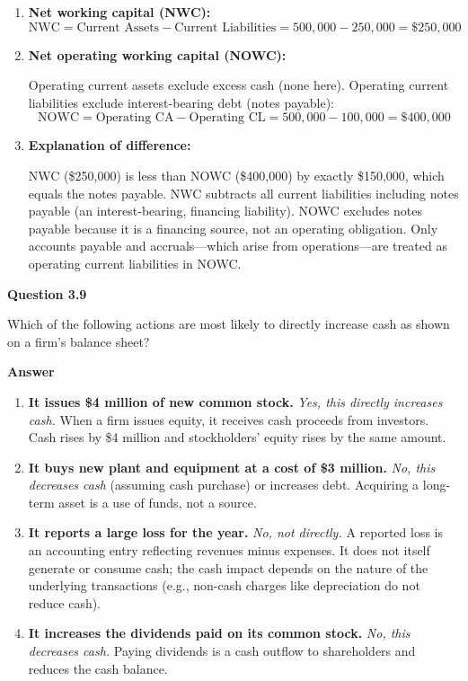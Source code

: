 \documentclass[11pt]{article}
\begin{document}
\begin{enumerate}
  \item[f.] \textbf{Net working capital (NWC):}
    \[
      \text{NWC} = \text{Current Assets} - \text{Current Liabilities} = 500{,}000 - 250{,}000 = \boxed{\$250{,}000}
    \]

  \item[g.] \textbf{Net operating working capital (NOWC):}

    Operating current assets exclude excess cash (none here). Operating current liabilities exclude interest-bearing debt (notes payable):
    \[
      \text{NOWC} = \text{Operating CA} - \text{Operating CL} = 500{,}000 - 100{,}000 = \boxed{\$400{,}000}
    \]

  \item[h.] \textbf{Explanation of difference:}

    NWC (\$250,000) is less than NOWC (\$400,000) by exactly \$150,000, which equals the notes payable. NWC subtracts all current liabilities including notes payable (an interest-bearing, financing liability). NOWC excludes notes payable because it is a financing source, not an operating obligation. Only accounts payable and accruals---which arise from operations---are treated as operating current liabilities in NOWC.
\end{enumerate}

\bigskip
\bigskip

\textbf{Question 3.9}
\bigskip

Which of the following actions are most likely to directly increase cash as shown on a firm's balance sheet?

\bigskip
\textbf{Answer}

\begin{enumerate}
  \item[a.] \textbf{It issues \$4 million of new common stock.} \textit{Yes, this directly increases cash.} When a firm issues equity, it receives cash proceeds from investors. Cash rises by \$4 million and stockholders' equity rises by the same amount.

  \item[b.] \textbf{It buys new plant and equipment at a cost of \$3 million.} \textit{No, this decreases cash} (assuming cash purchase) or increases debt. Acquiring a long-term asset is a use of funds, not a source.

  \item[c.] \textbf{It reports a large loss for the year.} \textit{No, not directly.} A reported loss is an accounting entry reflecting revenues minus expenses. It does not itself generate or consume cash; the cash impact depends on the nature of the underlying transactions (e.g., non-cash charges like depreciation do not reduce cash).

  \item[d.] \textbf{It increases the dividends paid on its common stock.} \textit{No, this decreases cash.} Paying dividends is a cash outflow to shareholders and reduces the cash balance.
\end{enumerate}
\end{document}
